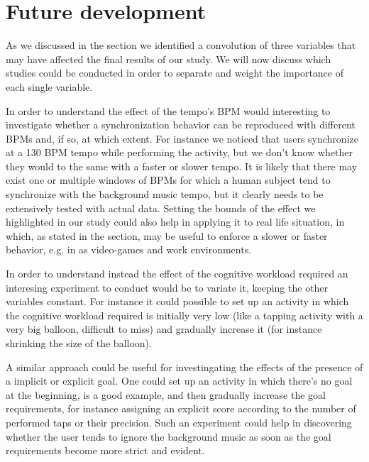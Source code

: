 
\section{Future development}\label{sec:future}
As we discussed in the  section we identified a convolution of three variables that may have affected the final results of our study.
We will now discuss which studies could be conducted in order to separate and weight the importance of each single variable.

In order to understand the effect of the tempo's BPM would interesting to investigate whether a synchronization behavior can be reproduced with different BPMs and, if so, at which extent.
For instance we noticed that users synchronize at a 130 BPM tempo while performing the \testfirst activity, but we don't know whether they would to the same with a faster or slower tempo.
It is likely that there may exist one or multiple windows of BPMs for which a human subject tend to synchronize with the background music tempo, but it clearly needs to be extensively tested with actual data.
Setting the bounds of the effect we highlighted in our study could also help in applying it to real life situation, in which, as stated in the  section, may be useful to enforce a slower or faster behavior, e.g. in as video-games and work environments.

In order to understand instead the effect of the cognitive workload required an interesing experiment to conduct would be to variate it, keeping the other variables constant. For instance it could possible to set up an activity in which the cognitive workload required  is initially very low (like a tapping activity with a very big balloon, difficult to miss) and gradually increase it (for instance shrinking the size of the balloon).

A similar approach could be useful for investingating the effects of the presence of a implicit or explicit goal. One could set up an activity in which there's no goal at the beginning, \testfirst is a good example, and then gradually increase the goal requirements, for instance assigning an explicit score according to the number of performed taps or their precision.
Such an experiment could help in discovering whether the user tends to ignore the background music as soon as the goal requirements become more strict and evident.